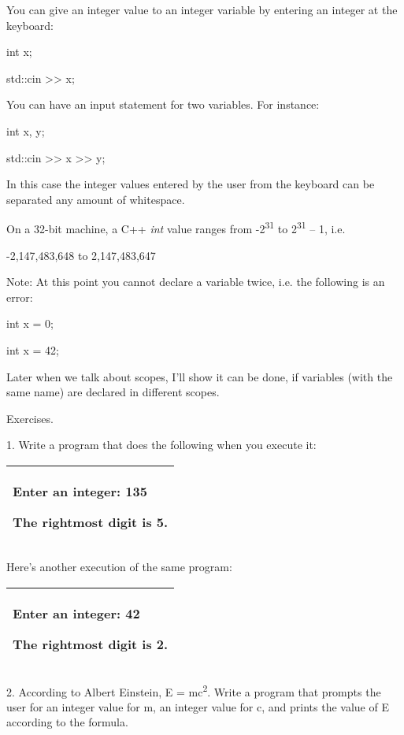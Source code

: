 \documentclass[
]{article}
\begin{document}
You can give an integer value to an integer variable by entering an
integer at the keyboard:

int x;

std::cin \textgreater\textgreater{} x;

You can have an input statement for two variables. For instance:

int x, y;

std::cin \textgreater\textgreater{} x \textgreater\textgreater{} y;

In this case the integer values entered by the user from the keyboard
can be separated any amount of whitespace.

On a 32-bit machine, a C++ \emph{int} value ranges from
-2\textsuperscript{31} to 2\textsuperscript{31 } -- 1, i.e.

-2,147,483,648 to 2,147,483,647

Note: At this point you cannot declare a variable twice, i.e. the
following is an error:

int x = 0;

int x = 42;

Later when we talk about scopes, I'll show it can be done, if variables
(with the same name) are declared in different scopes.

Exercises.

1. Write a program that does the following when you execute it:

\begin{longtable}[]{@{}l@{}}
\toprule
\endhead
\begin{minipage}[t]{0.97\columnwidth}\raggedright
Enter an integer: \textbf{135}

The rightmost digit is 5.\strut
\end{minipage}\tabularnewline
\bottomrule
\end{longtable}

Here's another execution of the same program:

\begin{longtable}[]{@{}l@{}}
\toprule
\endhead
\begin{minipage}[t]{0.97\columnwidth}\raggedright
Enter an integer: \textbf{42}

The rightmost digit is 2.\strut
\end{minipage}\tabularnewline
\bottomrule
\end{longtable}

2. According to Albert Einstein, E = mc\textsuperscript{2}. Write a
program that prompts the user for an integer value for m, an integer
value for c, and prints the value of E according to the formula.
\end{document}
